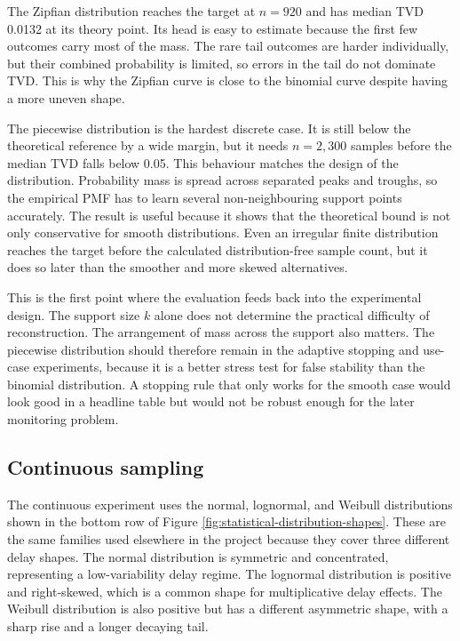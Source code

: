 \documentclass[a4paper,11pt]{report}
\begin{document}
The Zipfian distribution reaches the target at \(n=920\) and has median TVD 0.0132 at its theory point. Its head is easy to estimate because the first few outcomes carry most of the mass. The rare tail outcomes are harder individually, but their combined probability is limited, so errors in the tail do not dominate TVD. This is why the Zipfian curve is close to the binomial curve despite having a more uneven shape.

The piecewise distribution is the hardest discrete case. It is still below the theoretical reference by a wide margin, but it needs \(n=2{,}300\) samples before the median TVD falls below 0.05. This behaviour matches the design of the distribution. Probability mass is spread across separated peaks and troughs, so the empirical PMF has to learn several non-neighbouring support points accurately. The result is useful because it shows that the theoretical bound is not only conservative for smooth distributions. Even an irregular finite distribution reaches the target before the calculated distribution-free sample count, but it does so later than the smoother and more skewed alternatives.

This is the first point where the evaluation feeds back into the experimental design. The support size \(k\) alone does not determine the practical difficulty of reconstruction. The arrangement of mass across the support also matters. The piecewise distribution should therefore remain in the adaptive stopping and use-case experiments, because it is a better stress test for false stability than the binomial distribution. A stopping rule that only works for the smooth case would look good in a headline table but would not be robust enough for the later monitoring problem.

\subsection{Continuous sampling}

The continuous experiment uses the normal, lognormal, and Weibull distributions shown in the bottom row of Figure \ref{fig:statistical-distribution-shapes}. These are the same families used elsewhere in the project because they cover three different delay shapes. The normal distribution is symmetric and concentrated, representing a low-variability delay regime. The lognormal distribution is positive and right-skewed, which is a common shape for multiplicative delay effects. The Weibull distribution is also positive but has a different asymmetric shape, with a sharp rise and a longer decaying tail.
\end{document}

